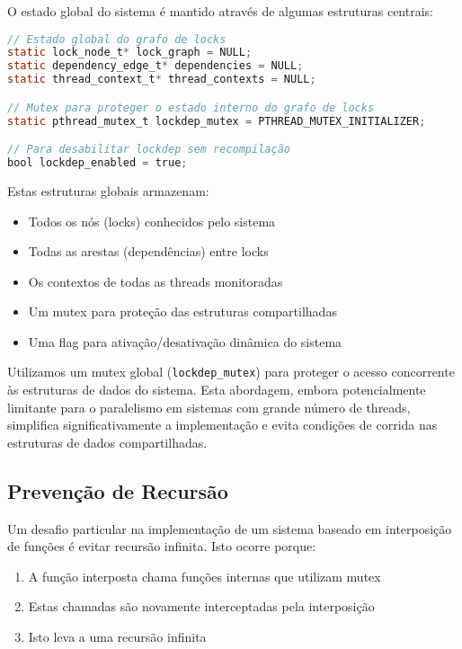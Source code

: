 O estado global do sistema é mantido através de algumas estruturas centrais:

\begin{lstlisting}[language=C, caption={Estruturas globais do sistema}]
// Estado global do grafo de locks
static lock_node_t* lock_graph = NULL;
static dependency_edge_t* dependencies = NULL;
static thread_context_t* thread_contexts = NULL;

// Mutex para proteger o estado interno do grafo de locks
static pthread_mutex_t lockdep_mutex = PTHREAD_MUTEX_INITIALIZER;

// Para desabilitar lockdep sem recompilação
bool lockdep_enabled = true;
\end{lstlisting}

Estas estruturas globais armazenam:
\begin{itemize}
    \item Todos os nós (locks) conhecidos pelo sistema
    \item Todas as arestas (dependências) entre locks
    \item Os contextos de todas as threads monitoradas
    \item Um mutex para proteção das estruturas compartilhadas
    \item Uma flag para ativação/desativação dinâmica do sistema
\end{itemize}

Utilizamos um mutex global (\texttt{lockdep\_mutex}) para proteger o acesso concorrente às estruturas de dados do sistema. Esta abordagem, embora potencialmente limitante para o paralelismo em sistemas com grande número de threads, simplifica significativamente a implementação e evita condições de corrida nas estruturas de dados compartilhadas.

\subsection{Prevenção de Recursão}

Um desafio particular na implementação de um sistema baseado em interposição de funções é evitar recursão infinita. Isto ocorre porque:

\begin{enumerate}
    \item A função interposta chama funções internas que utilizam mutex
    \item Estas chamadas são novamente interceptadas pela interposição
    \item Isto leva a uma recursão infinita
\end{enumerate}

